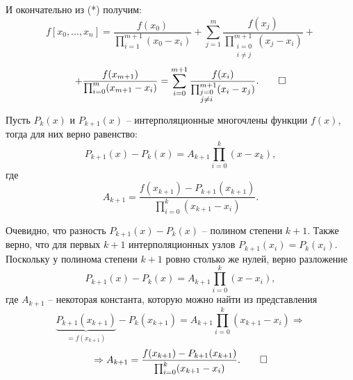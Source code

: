 \documentclass[../main.tex]{subfile}
\begin{document}
	И окончательно из (*) получим:
	\[f[x_0,...,x_n]=\frac{f(x_0)}{\prod_{i=1}^{m+1}(x_0-x_i)}+\sum_{j=1}^{m}
	\frac{f(x_j)}{\prod_{\substack{i=0\\ i\neq j}}^{m+1}(x_j-x_i)}+\]
	\[+\frac{f(x_{m+1})}{\prod_{i=0}^{m}(x_{m+1}-x_i)}=
	\sum_{i=0}^{m+1}\frac{f(x_i)}{\prod_{\substack{j=0\\ j\neq i}}^{m+1}
	(x_i-x_j)}.\qed\]

\begin{lemma}
	Пусть $P_k(x)$ и $P_{k+1}(x)$ -- интерполяционные многочлены функции $f(x)$,
	тогда для них верно равенство:
	\[P_{k+1}(x)-P_k(x)=A_{k+1}\prod_{i=0}^{k}(x-x_k),\]
	где
	\[A_{k+1}=\frac{f(x_{k+1})-P_{k+1}(x_{k+1})}{\prod_{i=0}^{k}(x_{k+1}-x_i)}.\]
\end{lemma}

\beginproof

	Очевидно, что разность $P_{k+1}(x)-P_{k}(x)$ -- полином степени $k+1$.
	Также верно, что для первых $k+1$ интерполяционных узлов $P_{k+1}(x_i)=
	P_{k}(x_i)$. Поскольку у полинома степени $k+1$ ровно столько же нулей,
	верно разложение
	\[P_{k+1}(x)-P_{k}(x)=A_{k+1}\prod_{i=0}^{k}(x-x_i),\]
	где $A_{k+1}$ -- некоторая константа, которую можно найти из представления
	\[\underset{=f(x_{k+1})}{\underbrace{P_{k+1}(x_{k+1})}}-P_{k}(x_{k+1})=
	A_{k+1}\prod_{i=0}^{k}(x_{k+1}-x_i)\Rightarrow\]
	\[\Rightarrow A_{k+1}=\frac{f(x_{k+1})-P_{k+1}(x_{k+1})}{\prod_{i=0}^{k}
	(x_{k+1}-x_i)}.\qed\]
\end{document}
